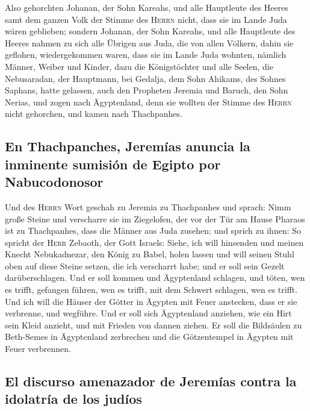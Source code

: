  Also gehorchten Johanan, der Sohn Kareahs, und alle
Hauptleute des Heeres samt dem ganzen Volk der Stimme des \textsc{Herrn}
nicht, dass sie im Lande Juda wären geblieben;  sondern
Johanan, der Sohn Kareahs, und alle Hauptleute des Heeres nahmen zu sich
alle Übrigen aus Juda, die von allen Völkern, dahin sie geflohen,
wiedergekommen waren, dass sie im Lande Juda wohnten, 
nämlich Männer, Weiber und Kinder, dazu die Königstöchter und alle
Seelen, die Nebusaradan, der Hauptmann, bei Gedalja, dem Sohn Ahikams,
des Sohnes Saphans, hatte gelassen, auch den Propheten Jeremia und
Baruch, den Sohn Nerias,  und zogen nach Ägyptenland, denn
sie wollten der Stimme des \textsc{Herrn} nicht gehorchen, und kamen
nach Thachpanhes.

\hypertarget{en-thachpanches-jeremuxedas-anuncia-la-inminente-sumisiuxf3n-de-egipto-por-nabucodonosor}{%
\subsection{En Thachpanches, Jeremías anuncia la inminente sumisión de
Egipto por
Nabucodonosor}\label{en-thachpanches-jeremuxedas-anuncia-la-inminente-sumisiuxf3n-de-egipto-por-nabucodonosor}}

 Und des \textsc{Herrn} Wort geschah zu Jeremia zu
Thachpanhes und sprach:  Nimm große Steine und verscharre
sie im Ziegelofen, der vor der Tür am Hause Pharaos ist zu Thachpanhes,
dass die Männer aus Juda zusehen;  und sprich zu ihnen:
So spricht der \textsc{Herr} Zebaoth, der Gott Israels: Siehe, ich will
hinsenden und meinen Knecht Nebukadnezar, den König zu Babel, holen
lassen und will seinen Stuhl oben auf diese Steine setzen, die ich
verscharrt habe; und er soll sein Gezelt darüberschlagen.
 Und er soll kommen und Ägyptenland schlagen, und töten,
wen es trifft, gefangen führen, wen es trifft, mit dem Schwert schlagen,
wen es trifft.  Und ich will die Häuser der Götter in
Ägypten mit Feuer anstecken, dass er sie verbrenne, und wegführe. Und er
soll sich Ägyptenland anziehen, wie ein Hirt sein Kleid anzieht, und mit
Frieden von dannen ziehen.  Er soll die Bildsäulen zu
Beth-Semes in Ägyptenland zerbrechen und die Götzentempel in Ägypten mit
Feuer verbrennen.

\hypertarget{el-discurso-amenazador-de-jeremuxedas-contra-la-idolatruxeda-de-los-juduxedos}{%
\subsection{El discurso amenazador de Jeremías contra la idolatría de
los
judíos}\label{el-discurso-amenazador-de-jeremuxedas-contra-la-idolatruxeda-de-los-juduxedos}}

